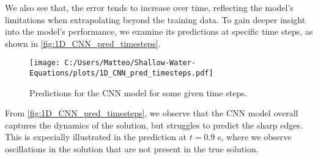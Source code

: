 We also see that, the error tends to increase over time, reflecting the model's limitations when extrapolating beyond the training data.
To gain deeper insight into the model's performance, we examine its predictions at specific time steps, as shown in \autoref{fig:1D_CNN_pred_timesteps}.
\begin{figure}[H]
    \centering
    \texttt{[image: C:/Users/Matteo/Shallow-Water-Equations/plots/1D\_CNN\_pred\_timesteps.pdf]}
    \caption{Predictions for the CNN model for some given time steps.}\label{fig:1D_CNN_pred_timesteps}
\end{figure}
From \autoref{fig:1D_CNN_pred_timesteps}, we observe that the CNN model overall captures the dynamics of the solution, but struggles to predict the sharp edges.
This is expecially illustrated in the prediction at $t = 0.9$ s, where we observe oscillations in the solution that are not present in the true solution.


